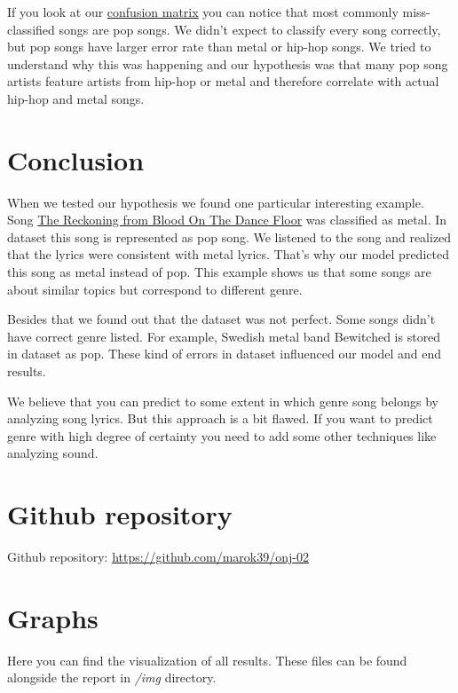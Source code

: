 \documentclass[a4paper,11pt]{article}
\begin{document}
If you look at our \hyperref[label-cf-matrix]{confusion matrix} you can notice that most commonly miss-classified songs are pop songs. We didn't expect to classify every song correctly, but pop songs have larger error rate than metal or hip-hop songs. We tried to understand why this was happening and our hypothesis was that many pop song artists feature artists from hip-hop or metal and therefore correlate with actual hip-hop and metal songs.


\section{Conclusion}

When we tested our hypothesis we found one particular interesting example. Song \href{https://www.youtube.com/watch?v=iKFYrPH5nRI}{The Reckoning from Blood On The Dance Floor} was classified as metal. In dataset this song is represented as pop song. We listened to the song and realized that the lyrics were consistent with metal lyrics. That's why our model predicted this song as metal instead of pop. This example shows us that some songs are about similar topics but correspond to different genre.

Besides that we found out that the dataset was not perfect. Some songs didn't have correct genre listed. For example, Swedish metal band Bewitched is stored in dataset as pop. These kind of errors in dataset influenced our model and end results.

We believe that you can predict to some extent in which genre song belongs by analyzing song lyrics. But this approach is a bit flawed. If you want to predict genre with high degree of certainty you need to add some other techniques like analyzing sound.


\section{Github repository}
Github repository: \href{https://github.com/marok39/onj-02}{https://github.com/marok39/onj-02}

\pagebreak
\appendix
\appendixpage
\section{\label{label-graphs} Graphs}

Here you can find the visualization of all results. These files can be found alongside the report in \textit{/img} directory.
\end{document}
